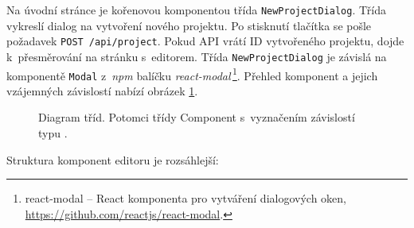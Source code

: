 Na úvodní stránce je kořenovou komponentou třída \texttt{NewProjectDialog}. Třída vykreslí dialog na vytvoření nového projektu. Po stisknutí tlačítka  se pošle požadavek \texttt{POST /api/project}. Pokud API vrátí ID vytvořeného projektu, dojde k~přesměrování na stránku s~editorem. Třída \texttt{NewProjectDialog} je závislá na komponentě \texttt{Modal} z~\textit{npm} balíčku \textit{react-modal}\,\footnote{react-modal -- React komponenta pro vytváření dialogových oken, \url{https://github.com/reactjs/react-modal}.}. Přehled komponent a jejich vzájemných závislostí nabízí obrázek \ref{img:react}.
\begin{figure}[h]
	\centering
	\caption{Diagram tříd. Potomci třídy Component s~vyznačením závislostí typu .}\label{img:react}
\end{figure}

Struktura komponent editoru je rozsáhlejší:

